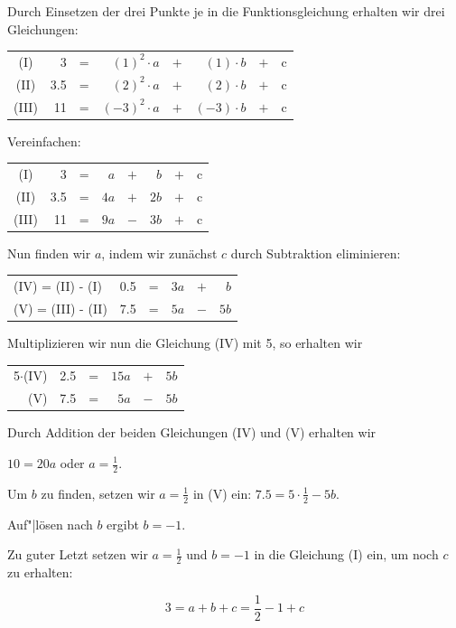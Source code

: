 Durch Einsetzen der drei Punkte je in die Funktionsgleichung erhalten
wir drei Gleichungen:

\begin{tabular}{c|r c rcrcr|}
  (I)   & 3   & = & $(1)^2\cdot{}a$  &$+$& $(1)\cdot{}b$  &$+$& c \\ 
  (II)  & 3.5 & = & $(2)^2\cdot{}a$  &$+$& $(2)\cdot{}b$  &$+$& c \\ 
  (III) & 11  & = & $(-3)^2\cdot{}a$ &$+$& $(-3)\cdot{}b$ &$+$& c \\ 
\end{tabular}

Vereinfachen:

\begin{tabular}{c|r c rcrcr|}
  (I)   & 3   & = & $a$  &$+$& $b$  &$+$& c \\ 
  (II)  & 3.5 & = & $4a$ &$+$& $2b$ &$+$& c \\ 
  (III) & 11  & = & $9a$ &$-$& $3b$ &$+$& c \\ 
\end{tabular}

Nun finden wir $a$, indem wir zunächst $c$ durch Subtraktion
eliminieren:

\begin{tabular}{l|r c rcr|}
  (IV) = (II) -   (I) & 0.5  & = & $3a$ &$+$& $b$ \\ 
  (V)  = (III) - (II) & 7.5  & = & $5a$ &$-$& $5b$ \\ 
\end{tabular}

Multiplizieren wir nun die Gleichung (IV) mit 5, so erhalten wir

\begin{tabular}{r|r c rcr|}
  5$\cdot{}$(IV)  & 2.5  & = & $15a$ &$+$& $5b$ \\ 
  (V)             & 7.5  & = & $5a$  &$-$& $5b$ \\ 
\end{tabular}

Durch Addition der beiden Gleichungen (IV) und (V) erhalten wir

$10 = 20a$ oder $a = \frac{1}{2}$.

Um $b$ zu finden, setzen wir $a = \frac{1}{2}$ in (V) ein: $7.5 =
5\cdot{}\frac{1}{2} - 5b$.

Auf"|lösen nach $b$ ergibt $b = -1$.

Zu guter Letzt setzen wir $a = \frac{1}{2}$ und $b=-1$ in die
Gleichung (I) ein, um noch $c$ zu erhalten:

$$3 = a + b + c = \frac{1}{2} - 1 + c$$


